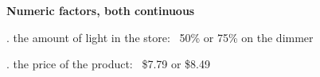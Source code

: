 
\begin{frame}\frametitle{}
	
	{\LARGE\textbf{{\color{purple} Numeric factors, both continuous}}}
	
	\vspace{24pt}
		. the amount of light in the store: \quad\, 50\% or 75\% on the dimmer
		
	\vspace{12pt}
	
		\pause
		. the price of the product: \qquad\qquad\, \$7.79 or \$8.49
	
\end{frame}
